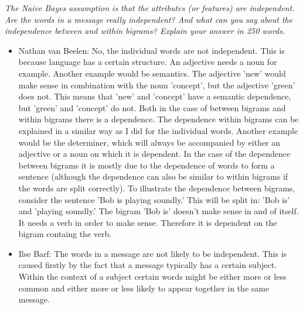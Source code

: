 \documentclass{article}
\begin{document}
\textit{ The Naive Bayes assumption is that the attributes (or features) are independent.  Are the
words  in  a  message  really  independent?   And  what  can  you  say  about  the  independence
between and within bigrams?  Explain your answer in 250 words.}
\begin{itemize}
    \item Nathan van Beelen: No, the individual words are not independent. This is
                             because language has a certain structure. An adjective
                             needs a noun for example. Another example would be
                             semantics. The adjective 'new' would make sense in 
                             combination with the noun 'concept', but the adjective
                             'green' does not. This means that 'new' and 'concept'
                             have a semantic dependence, but 'green' and 'concept'
                             do not. Both in the case of between bigrams
                             and within bigrams there is a dependence. The dependence within
                             bigrams can be explained in a similar way as I did for the
                             individual words. Another example would be the determiner,
                             which will always be accompanied by either an adjective or
                             a noun on which it is dependent. In the case of the dependence
                             between bigrams it is mostly due to the dependence of words
                             to form a sentence (although the dependence can also be similar
                             to within bigrams if the words are split correctly).
                             To illustrate the dependence between bigrams, consider the
                             sentence 'Bob is playing soundly.' This will be split in:
                             'Bob is' and 'playing soundly.' The bigram 'Bob is' doesn't
                             make sense in and of itself. It needs a verb in order to make
                             sense. Therefore it is dependent on the bigram containg the
                             verb.
    \item Ilse Barf:         The words in a message are not likely to be independent. This
                             is caused firstly by the fact that a message typically has a
                             certain subject. Within the context of a subject certain words might
                             be either more or less common and either more or less likely to
                             appear together in the same message.


\end{itemize}
\end{document}
